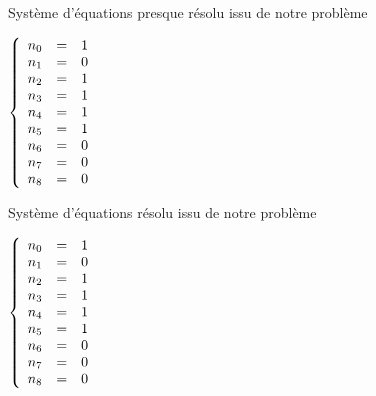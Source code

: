 \documentclass[10pt,a2paper]{article}
\begin{document}
\newpage\begin{LARGE}Système d'équations presque résolu issu de notre problème\end{LARGE}

\vspace{2em}$\left\{\begin{array}{c c l}n_{0} &=& 1\\n_{1} &=& 0\\n_{2} &=& 1\\n_{3} &=& 1\\n_{4} &=& 1\\n_{5} &=& 1\\n_{6} &=& 0\\n_{7} &=& 0\\n_{8} &=& 0\\\end{array}\right.$\newpage\begin{LARGE}Système d'équations résolu issu de notre problème\end{LARGE}

\vspace{2em}$\left\{\begin{array}{c c l}n_{0} &=& 1\\n_{1} &=& 0\\n_{2} &=& 1\\n_{3} &=& 1\\n_{4} &=& 1\\n_{5} &=& 1\\n_{6} &=& 0\\n_{7} &=& 0\\n_{8} &=& 0\\\end{array}\right.$\newpage
\end{document}

